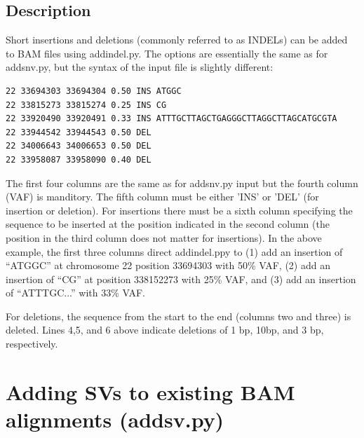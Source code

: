 \documentclass[letterpaper,11pt]{article}
\begin{document}
\subsection{Description}
Short insertions and deletions (commonly referred to as INDELs) can be added to BAM files using addindel.py. The options are essentially the same as for addsnv.py, but the syntax of the input file is slightly different:

\begin{verbatim}
22 33694303 33694304 0.50 INS ATGGC
22 33815273 33815274 0.25 INS CG
22 33920490 33920491 0.33 INS ATTTGCTTAGCTGAGGGCTTAGGCTTAGCATGCGTA
22 33944542 33944543 0.50 DEL
22 34006643 34006653 0.50 DEL
22 33958087 33958090 0.40 DEL
\end{verbatim}

The first four columns are the same as for addsnv.py input but the fourth column (VAF) is manditory. The fifth column must be either 'INS' or 'DEL' (for insertion or deletion). For insertions there must be a sixth column specifying the sequence to be inserted at the position indicated in the second column (the position in the third column does not matter for insertions). In the above example, the first three columns direct addindel.ppy to (1) add an insertion of ``ATGGC'' at chromosome 22 position 33694303 with 50\% VAF, (2) add an insertion of ``CG'' at position 338152273 with 25\% VAF, and (3) add an insertion of ``ATTTGC...'' with 33\% VAF.

For deletions, the sequence from the start to the end (columns two and three) is deleted. Lines 4,5, and 6 above indicate deletions of 1 bp, 10bp, and 3 bp, respectively.

\section{Adding SVs to existing BAM alignments (addsv.py)}
\end{document}
